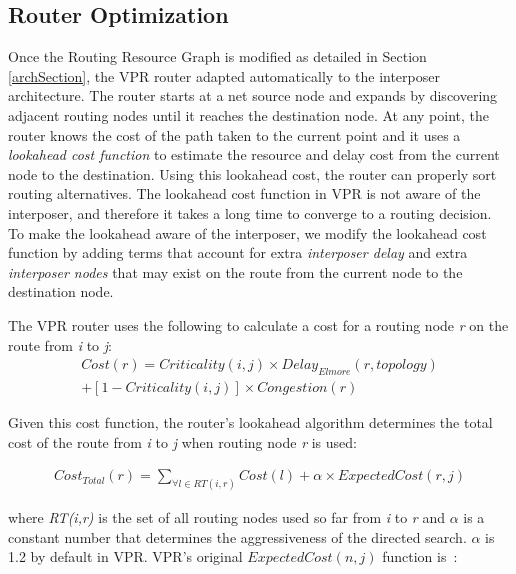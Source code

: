 \documentclass[journal]{IEEEtran}
\begin{document}
\subsection{Router Optimization}
\label{sec:router_optimizations}
Once the Routing Resource Graph is modified as detailed in Section \ref{archSection}, the VPR router adapted automatically to the interposer architecture. The router starts at a net source node and expands by discovering adjacent routing nodes until it reaches the destination node. At any point, the router knows the cost of the path taken to the current point and it uses a \textit{lookahead cost function} to estimate the resource and delay cost from the current node to the destination. Using this lookahead cost, the router can properly sort routing alternatives. The lookahead cost function in VPR is not aware of the interposer, and therefore it takes a long time to converge to a routing decision. To make the lookahead aware of the interposer, we modify the lookahead cost function by adding terms that account for extra \textit{interposer delay} and extra \textit{interposer nodes} that may exist on the route from the current node to the destination node.

The VPR router uses the following to calculate a cost for a routing node \textit{r} on the route from \textit{i} to \textit{j}:
\setlength{\arraycolsep}{0.0em}
\begin{multline}
\label{eq:routing_cost}
Cost(r) = Criticality(i,j) \times Delay_{Elmore}(r, topology) \\ + [1-Criticality(i,j)] \times Congestion(r)
\end{multline}
\setlength{\arraycolsep}{5pt}

Given this cost function, the router's lookahead algorithm determines the total cost of the route from \textit{i} to \textit{j} when routing node \textit{r} is used:

\setlength{\arraycolsep}{0.0em}
\begin{multline}
\label{eq:lookahead_cost}
Cost_{Total}(r) = \sum_{\forall l \in RT(i,r)} Cost(l) + \alpha \times ExpectedCost(r,j)
\end{multline}
\setlength{\arraycolsep}{5pt}

where \textit{RT(i,r)} is the set of all routing nodes used so far from \textit{i} to \textit{r} and $\alpha$ is a constant number that determines the aggressiveness of the directed search. $\alpha$ is 1.2 by default in VPR. VPR's original $ExpectedCost(n,j)$ function is~\cite{betz1999architecture}: 
\end{document}
